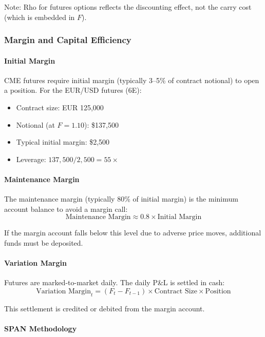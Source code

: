 Note: Rho for futures options reflects the discounting effect, not the carry cost (which is embedded in $F$).

\subsubsection{Margin and Capital Efficiency}

\paragraph{Initial Margin}

CME futures require initial margin (typically 3--5\% of contract notional) to open a position. For the EUR/USD futures (6E):
\begin{itemize}
  \item Contract size: EUR 125,000
  \item Notional (at $F = 1.10$): \$137,500
  \item Typical initial margin: \$2,500
  \item Leverage: $137{,}500 / 2{,}500 = 55\times$
\end{itemize}

\paragraph{Maintenance Margin}

The maintenance margin (typically 80\% of initial margin) is the minimum account balance to avoid a margin call:
\[
\text{Maintenance Margin} \approx 0.8 \times \text{Initial Margin}
\]

If the margin account falls below this level due to adverse price moves, additional funds must be deposited.

\paragraph{Variation Margin}

Futures are marked-to-market daily. The daily P\&L is settled in cash:
\[
\text{Variation Margin}_t = (F_t - F_{t-1}) \times \text{Contract Size} \times \text{Position}
\]

This settlement is credited or debited from the margin account.

\paragraph{SPAN Methodology}

